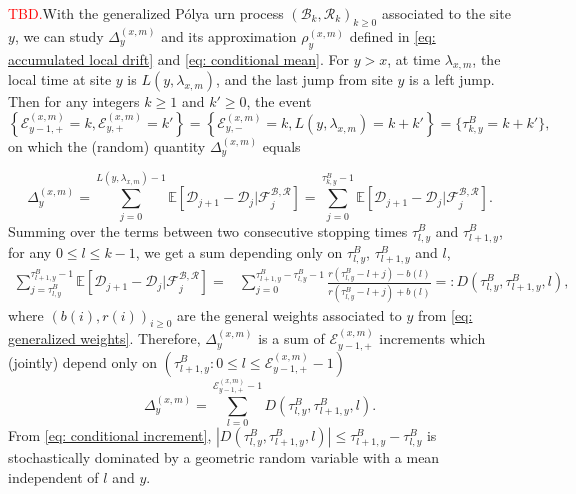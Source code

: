 \documentclass[twoside,12pt,a4paper]{article}
\numberwithin{equation}{section}
\newcommand{\abs}[1]{\left\vert #1 \right\vert}
\newcommand\TBD{\textcolor{red}{TBD.}}
\begin{document}
	\TBD With the generalized P\'{o}lya urn process $(\mathcal{B}_k,\mathcal{R}_k )_{k\geq 0}$ associated to the site $y$, we can study $\Delta_{y}^{(x,m)}$ and its approximation $\rho_{y}^{(x,m)}$ defined in \eqref{eq: accumulated local drift} and \eqref{eq: conditional mean}. For $y>x $, at time $\lambda_{x,m}$, the local time at site $y$ is $L(y,\lambda_{x,m})$, and the last jump from site $y$ is a left jump. Then for any integers $k\geq 1$ and $k' \geq 0$, the event 
	$$\left\{ \mathcal{E}^{(x,m)}_{y-1,+} =k, \mathcal{E}^{(x,m)}_{y,+} = k'\right\} = \left\{\mathcal{E}^{(x,m)}_{y,-} =k,  L(y,\lambda_{x,m}) = k+k' \right\} = \{ \tau^B_{k,y} = k+k' \},$$ on which the (random) quantity $\Delta_{y}^{(x,m)}$ equals


	\[
	\Delta_{y}^{(x,m)} =\sum_{j=0}^{ L(y,\lambda_{x,m})-1} \mathbb{E}\left[ \mathcal{D}_{j+1} -\mathcal{D}_{j}  \vert \mathcal{F}^{\mathcal{B},\mathcal{R}}_{j} \right] = \sum_{j=0}^{\tau^B_{k,y}-1} \mathbb{E}\left[ \mathcal{D}_{j+1} -\mathcal{D}_{j}  \vert \mathcal{F}^{\mathcal{B},\mathcal{R}}_{j} \right].  
	\] 
	Summing over the terms between two consecutive stopping times $\tau^{B}_{l,y} $ and $\tau^{B}_{l+1,y} $, for any $0\leq l \leq k -1$,  we get a sum depending only on $\tau^{B}_{l,y} $, $\tau^{B}_{l+1,y} $ and $l$, 
	\begin{align} \label{eq: conditional increment}
		 \sum_{j=\tau^{B}_{l,y}}^{\tau^B_{l+1,y}-1} \mathbb{E}\left[ \mathcal{D}_{j+1} - \mathcal{D}_{j}  \vert \mathcal{F}^{\mathcal{B},\mathcal{R}}_{j} \right] =&
		  \sum_{j=0}^{\tau^B_{l+1,y}-\tau^{B}_{l,y}-1} \frac{ r(\tau^{B}_{l,y}-l + j) - b(l)  }{ r(\tau^{B}_{l,y}-l + j) + b(l)  } 
		  =:  D\left(\tau^{B}_{l,y},\tau^{B}_{l+1,y},l\right),
	\end{align}   
	where $(b(i),r(i))_{i\geq 0}$ are the general weights associated to $y$ from \eqref{eq: generalized weights}.
	Therefore,  $\Delta_{y}^{(x,m)}$ is a sum of $\mathcal{E}^{(x,m)}_{y-1,+} $ increments which (jointly) depend only on $ \left(\tau^{B}_{l+1,y}: 0\leq l\leq   \mathcal{E}^{(x,m)}_{y-1,+}-1 \right) $
			\begin{equation} \label{eq: cummulated drift at a site}
				\Delta_{y}^{(x,m)} = \sum_{l=0 }^{ \mathcal{E}^{(x,m)}_{y-1,+} -1  } D\left(\tau^{B}_{l,y},\tau^{B}_{l+1,y},l \right).
			\end{equation}			
	From \eqref{eq: conditional increment}, $\abs{  D\left(\tau^{B}_{l,y},\tau^{B}_{l+1,y},l\right)} \leq  \tau^{B}_{l+1,y}-\tau^{B}_{l,y}$ is stochastically dominated by a geometric random variable with a mean independent of $l$ and $y$. 
\end{document}
